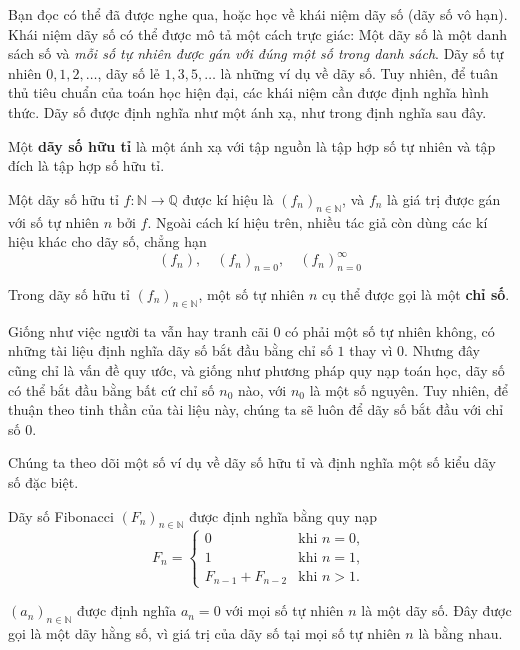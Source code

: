 Bạn đọc có thể đã được nghe qua, hoặc học về khái niệm dãy số (dãy số vô hạn). Khái niệm dãy số có thể được mô tả một cách trực giác: Một dãy số là một danh sách số và \textit{mỗi số tự nhiên được gán với đúng một số trong danh sách}. Dãy số tự nhiên $0, 1, 2, \ldots$, dãy số lẻ $1, 3, 5, \ldots$ là những ví dụ về dãy số. Tuy nhiên, để tuân thủ tiêu chuẩn của toán học hiện đại, các khái niệm cần được định nghĩa hình thức. Dãy số được định nghĩa như một ánh xạ, như trong định nghĩa sau đây.

\begin{definition}
    Một \textbf{dãy số hữu tỉ} là một ánh xạ với tập nguồn là tập hợp số tự nhiên và tập đích là tập hợp số hữu tỉ.

    \noindent Một dãy số hữu tỉ $f: \mathbb{N}\to\mathbb{Q}$ được kí hiệu là ${(f_{n})}_{n\in\mathbb{N}}$, và $f_{n}$ là giá trị được gán với số tự nhiên $n$ bởi $f$. Ngoài cách kí hiệu trên, nhiều tác giả còn dùng các kí hiệu khác cho dãy số, chẳng hạn
    \[
        {(f_{n})}, \quad {(f_{n})}_{n=0}, \quad {(f_{n})}^{\infty}_{n=0}
    \]

    \noindent Trong dãy số hữu tỉ ${(f_{n})}_{n\in\mathbb{N}}$, một số tự nhiên $n$ cụ thể được gọi là một \textbf{chỉ số}.
\end{definition}

Giống như việc người ta vẫn hay tranh cãi $0$ có phải một số tự nhiên không, có những tài liệu định nghĩa dãy số bắt đầu bằng chỉ số $1$ thay vì $0$. Nhưng đây cũng chỉ là vấn đề quy ước, và giống như phương pháp quy nạp toán học, dãy số có thể bắt đầu bằng bất cứ chỉ số $n_{0}$ nào, với $n_{0}$ là một số nguyên. Tuy nhiên, để thuận theo tinh thần của tài liệu này, chúng ta sẽ luôn để dãy số bắt đầu với chỉ số $0$.

Chúng ta theo dõi một số ví dụ về dãy số hữu tỉ và định nghĩa một số kiểu dãy số đặc biệt.
\begin{example}
    Dãy số Fibonacci ${(F_{n})}_{n\in\mathbb{N}}$ được định nghĩa bằng quy nạp
    \[
        F_{n} = \begin{cases}
            0                 & \text{khi $n = 0$}, \\
            1                 & \text{khi $n = 1$}, \\
            F_{n-1} + F_{n-2} & \text{khi $n > 1$}.
        \end{cases}
    \]
\end{example}

\begin{example}
    ${(a_{n})}_{n\in\mathbb{N}}$ được định nghĩa $a_{n} = 0$ với mọi số tự nhiên $n$ là một dãy số. Đây được gọi là một dãy hằng số, vì giá trị của dãy số tại mọi số tự nhiên $n$ là bằng nhau.
\end{example}

